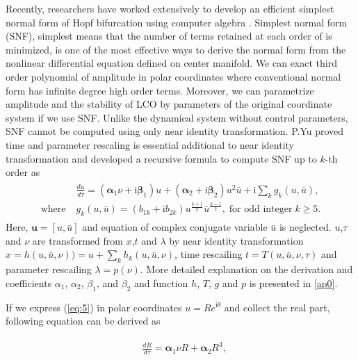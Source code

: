 \documentclass[openacc]{rsproca_new}%
\def\vec#1{\ensuremath{\mathbf{#1}}}
\newcommand{\Eref}[1]{(\ref{#1})}
\begin{document}
Recently, researchers have worked extensively to develop an efficient simplest normal form of Hopf bifurcation using computer algebra \cite{algaba1998hypernormal,yu1998computation}. Simplest normal form (SNF), simplest means that the number of terms retained at each order of is minimized, is one of the most effective ways to derive the normal form from the nonlinear differential equation defined on center manifold. We can exact third order polynomial of amplitude in polar coordinates where conventional normal form has infinite degree high order terms. Moreover, we can parametrize amplitude and the stability of LCO by parameters of the original coordinate system if we use SNF. Unlike the dynamical system without control parameters, SNF cannot be computed using only near identity transformation. P.Yu \cite{yu2002simplest} proved time and parameter rescaling is essential additional to near identity transformation and developed a recursive formula to compute SNF up to $k$-th order as
\begin{align}\label{eq:5}
  \begin{split}
    &\frac{du}{d\tau}=(\vec{\alpha}_1 \nu+\textrm{i}\vec{\beta}_1) u+(\vec{\alpha}_2+\textrm{i}\vec{\beta}_2) u^2 \bar{u}+\textrm{i}\sum_k g_k(u,\bar{u}),\\
    \textrm{where} \;  &g_k(u,\bar{u})=(b_{1k}+\textrm{i}b_{2k})u^{\frac{k+1}{2}}\bar{u}^{\frac{k-1}{2}}, \; \textrm{for odd integer} \;k \geq 5.
  \end{split}
\end{align}
Here, \(\vec{u}=[u,\bar{u}]\) and equation of complex conjugate variable \(\bar{u}\) is neglected. \(u\),\(\tau\) and \(\nu\) are transformed from \(x\),\(t\) and \(\lambda\) by near identity transformation
\(x=h(u,\bar{u},\nu))=u+\sum_k h_k(u,\bar{u},\nu)\), time rescailing \(t=T(u,\bar{u},\nu,\tau)\) and parameter rescailing \(\lambda=p(\nu)\). More detailed explanation on the derivation and coefficients $\alpha_1$, $\alpha_2$, $\beta_1$, and $\beta_2$ and function $h$, $T$, $g$ and $p$ is presented in \ref{ap0}.

If we express \Eref{eq:5} in polar coordinates $u=Re^{\textrm{i}\theta}$ and collect the real part, following equation can be derived as

\begin{align}\label{eq:polar}
  \begin{split}
    &\frac{dR}{d\tau}=\vec{\alpha}_1 \nu R+\vec{\alpha}_2 R^3,
  \end{split}
\end{align}
\end{document}
